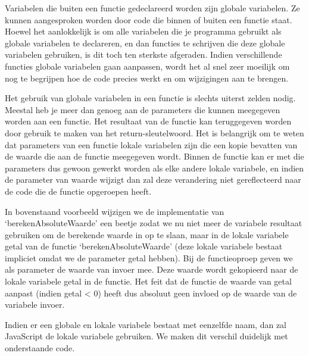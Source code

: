Variabelen die buiten een functie gedeclareerd worden zijn globale variabelen. Ze kunnen aangesproken worden door code die binnen of buiten een functie staat. Hoewel het aanlokkelijk is om alle variabelen die je programma gebruikt als globale variabelen te declareren, en dan functies te schrijven die deze globale variabelen gebruiken, is dit toch ten sterkste afgeraden. Indien verschillende functies globale variabelen gaan aanpassen, wordt het al snel zeer moeilijk om nog te begrijpen hoe de code precies werkt en om wijzigingen aan te brengen.

Het gebruik van globale variabelen in een functie is slechts uiterst zelden nodig. Meestal heb je meer dan genoeg aan de parameters die kunnen meegegeven worden aan een functie. Het resultaat van de functie kan teruggegeven worden door gebruik te maken van het return-sleutelwoord. Het is belangrijk om te weten dat parameters van een functie lokale variabelen zijn die een kopie bevatten van de waarde die aan de functie meegegeven wordt. Binnen de functie kan er met die parameters dus gewoon gewerkt worden als elke andere lokale variabele, en indien de parameter van waarde wijzigt dan zal deze verandering niet gereflecteerd naar de code die de functie opgeroepen heeft.


In bovenstaand voorbeeld wijzigen we de implementatie van `berekenAbsoluteWaarde' een beetje zodat we nu niet meer de variabele resultaat gebruiken om de berekende waarde in op te slaan, maar in de lokale variabele getal van de functie `berekenAbsoluteWaarde' (deze lokale variabele bestaat impliciet omdat we de parameter getal hebben). Bij de functieoproep geven we als parameter de waarde van invoer mee. Deze waarde wordt gekopieerd naar de lokale variabele getal in de functie. Het feit dat de functie de waarde van getal aanpast (indien getal < 0) heeft dus absoluut geen invloed op de waarde van de variabele invoer.

Indien er een globale en lokale variabele bestaat met eenzelfde naam, dan zal JavaScript de lokale variabele gebruiken. We maken dit verschil duidelijk met onderstaande code.


